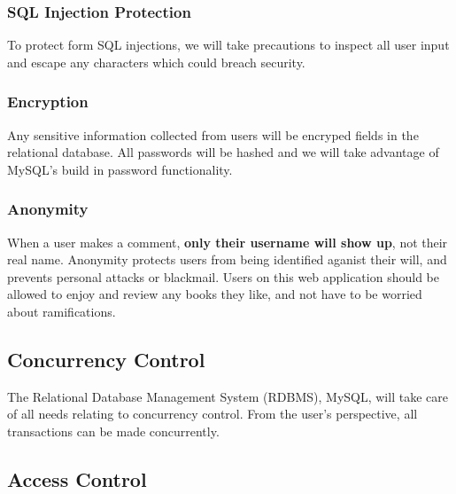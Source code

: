 \documentclass[letter, 12pt, titlepage]{article}
\begin{document}
			\subsubsection{SQL Injection Protection}
				To protect form SQL injections, we will take precautions to inspect all user input and escape any characters which could breach security.

			\subsubsection{Encryption}
				Any sensitive information collected from users will be encryped fields in the relational database. All passwords will be hashed and we will take advantage of MySQL's build in password functionality.

			\subsubsection{Anonymity}
				When a user makes a comment, \textbf{only their username will show up}, not their real name. Anonymity protects users from being identified aganist their will, and prevents personal attacks or blackmail. Users on this web application should be allowed to enjoy and review any books they like, and not have to be worried about ramifications.
		
		\subsection{Concurrency Control}
			The Relational Database Management System (RDBMS), MySQL, will take care of all needs relating to concurrency control. From the user's perspective, all transactions can be made concurrently. 

		\subsection{Access Control}
\end{document}
